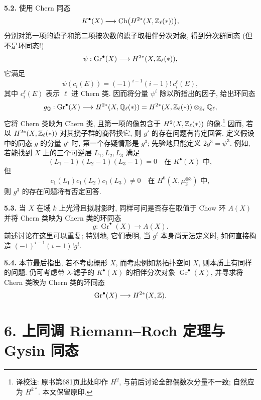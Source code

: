 \noindent{}\textbf{5.2.}
使用 Chern 同态
\[
 K^\bullet(X)\longrightarrow
 \operatorname{Ch}\bigl(H^{2*}(X,\mathbb Z_\ell(*))\bigr),
\]
分别对第一项的滤子和第二项按次数的滤子取相伴分次对象, 得到分次群同态 (但不是环同态!)
\[
 \psi:\operatorname{Gr}^\bullet(X)
 \longrightarrow H^{2*}(X,\mathbb Z_\ell(*)),
\]
它满足
\[
 \psi(c_i(E))=(-1)^{i-1}(i-1)!\,c_i^\ell(E),
\]
其中 $c_i^\ell(E)$ 表示 $\ell$ 进 Chern 类. 因而将分量 $\psi^i$ 除以所指出的因子, 给出环同态
\[
 g_\mathbb Q:\operatorname{Gr}^\bullet(X)
 \longrightarrow H^{2*}(X,\mathbb Q_\ell(*))
 =H^{2*}(X,\mathbb Z_\ell(*))\otimes_{\mathbb Z_\ell}\mathbb Q_\ell,
\]
它将 Chern 类映为 Chern 类, 且第一项的像包含于 $H^2(X,\mathbb Z_\ell(*))$ 的像.\footnote{译校注: 原书第681页此处印作 $H^2$, 与前后讨论全部偶数次分量不一致; 自然应为 $H^{2*}$. 本文保留原印.} 因而, 若以 $H^{2*}(X,\mathbb Z_\ell(*))$ 对其挠子群的商替换它, 则 $g'$ 的存在问题有肯定回答. 定义假设中的同态 $g$ 的分量 $g^i$ 时, 第一个存疑情形是 $g^3$; 先验地只能定义 $2g^3=\psi^3$. 例如, 若能找到 $X$ 上的三个可逆层 $L_1,L_2,L_3$ 满足
\[
 (L_1-1)(L_2-1)(L_3-1)=0
 \quad\text{在 }K^\bullet(X)\text{ 中},
\]
但
\[
 c_1(L_1)c_1(L_2)c_1(L_3)\ne0
 \quad\text{在 }H^6(X,\mu_2^{\otimes3})\text{ 中},
\]
则 $g^3$ 的存在问题将有否定回答.

\noindent{}\textbf{5.3.}
当 $X$ 在域 $k$ 上光滑且拟射影时, 同样可问是否存在取值于 Chow 环 $A(X)$ 并将 Chern 类映为 Chern 类的环同态
\[
 g:\operatorname{Gr}^\bullet(X)\longrightarrow A(X).
\]
前述讨论在这里可以重复; 特别地, 它们表明, 当 $g^i$ 本身尚无法定义时, 如何直接构造 $(-1)^{i-1}(i-1)!g^i$.

\noindent{}\textbf{5.4.}
本节最后指出, 若不考虑概形 $X$, 而考虑例如紧拓扑空间 $X$, 则本质上有同样的问题. 仍可考虑带 $\lambda$-滤子的 $K^\bullet(X)$ 的相伴分次对象 $\operatorname{Gr}^\bullet(X)$, 并寻求将 Chern 类映为 Chern 类的环同态
\[
 \operatorname{Gr}^\bullet(X)\longrightarrow H^{2*}(X,\mathbb Z).
\]

\section*{6. 上同调 Riemann--Roch 定理与 Gysin 同态}

